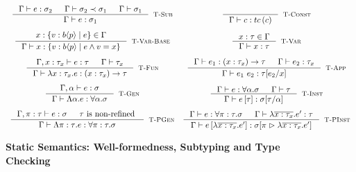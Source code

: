 \begin{figure}[ht!]
\medskip {}

$$\begin{array}{cc}

\inference
  {  \hastype{\Gamma}{e}{\sigma_2} && \isSubType{\Gamma}{\sigma_2}{\sigma_1} 
  && \isWellFormed{\Gamma}{\sigma_1}
  }
  {\hastype{\Gamma}{e}{\sigma_1}}
  [\tsub]
&

\inference
  {}
  {\hastype{\Gamma}{c}{\tc{c}}}
  [\tconst]


\\[0.2in]

\inference
  {x: \tpref{b}{\areft}{\reft} \in \Gamma}
  {\hastype{\Gamma}{x}{\tpref{b}{\areft}{e \land \vref = x}}}
  [\tbase]

&

\inference
  {x:\tau \in \Gamma}
  {\hastype{\Gamma}{x}{\tau}} 
  [\tvariable]

\\[0.2in]

\inference
   {\hastype{\Gamma, x:\tau_x}{e}{\tau} 
    && \isWellFormed{\Gamma}{\tau_x}
   }
   {\hastype{\Gamma}{\efunt{x}{\tau_x}{e}}{\tfun{x}{\tau_x}{\tau}}}
   [\tfunction]

& 

\label{tapp}
\inference
   {\hastype{\Gamma}{e_1}{\tfun{x}{\tau_x}{\tau}} 
   &&  \hastype{\Gamma}{e_2}{\tau_x}
   }
   {\hastype{\Gamma}{\eapp{e_1}{e_2}}{\SUBST{\tau}{x}{e_2}}}
   [\tapp]

\\[0.2in]

\inference
  {\hastype{\Gamma, \alpha}{e}{\sigma}}
  {\hastype{\Gamma}{\etabs{\alpha}{e}}{\ttabs{\alpha}{\sigma}}}
  [\tgen]

&  
\inference
  {\hastype{\Gamma}{e}{\ttabs{\alpha}{\sigma}} && 
   \isWellFormed{\Gamma}{\tau}
  }
  {\hastype{\Gamma}{\etapp{e}{\tau}}{\SUBST{\sigma}{\alpha}{\tau}}}
  [\tinst]

\\[0.2in]

\inference
    {\hastype{\Gamma, \rvar:\tau}{e}{\sigma} && \tau \mbox{ is non-refined } 
    }
    {\hastype{\Gamma}{\epabs{\rvar}{\tau}{e}}{\tpabs{\rvar}{\tau}{\sigma}}}
    [\tpgen]
&  

\inference
    {\hastype{\Gamma}{e}{\tpabs{\rvar}{\tau}{\sigma}} && 
     \hastype{\Gamma}{\efunbar{x:\tau_x}{\reft'}}{\tau}
    }
    {\hastype{\Gamma}
             {\epapp{e}{\efunbar{x:\tau_x}{\reft'}}}
             {\rpinst{\sigma}{\rvar}{\efunbar{x:\tau_x}{\reft'}}}
    }
    [\tpinst]
\end{array}$$
\caption{\textbf{Static Semantics: Well-formedness, Subtyping and Type Checking}}
\label{fig:rules}
\end{figure}

